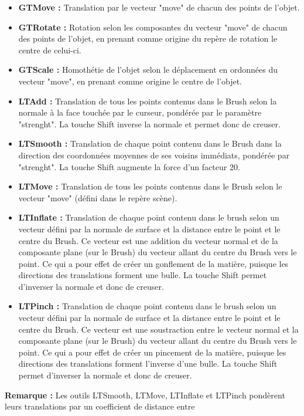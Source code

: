 \documentclass[a4paper]{memoir}
\begin{document}
					\begin{itemize}
						\item \textbf{GTMove :} Translation par le vecteur "move" de chacun des points de l'objet.
						\item \textbf{GTRotate :} Rotation selon les composantes du vecteur "move" de chacun des points de l'objet, en prenant comme origine 
						du repère de rotation le centre de celui-ci.
						\item \textbf{GTScale :} Homothétie de l'objet selon le déplacement en ordonnées du vecteur "move", en prenant comme origine le 
						centre de l'objet.
						\item \textbf{LTAdd :} Translation de tous les points contenus dans le Brush selon la normale à la face touchée par le curseur, 
						pondérée par le paramètre "strenght". La touche Shift inverse la normale et permet donc de creuser.
						\item \textbf{LTSmooth :} Translation de chaque point contenu dans le Brush dans la direction des coordonnées moyennes de ses 
						voisins immédiats, pondérée par "strenght". La touche Shift augmente la force d'un facteur 20.
						\item \textbf{LTMove :} Translation de tous les points contenus dans le Brush selon le vecteur "move" (défini dans le repère scène).
						\item \textbf{LTInflate :} Translation de chaque point contenu dans le brush selon un vecteur défini par la normale de surface et la 
						distance entre le point et le centre du Brush. Ce vecteur est une addition du vecteur normal et de la composante plane (sur le Brush)
						du vecteur allant du centre du Brush vers le point. Ce qui a pour effet de créer un gonflement de la matière, puisque les directions
						des translations forment une bulle. La touche Shift permet d'inverser la normale et donc de creuser.
						\item \textbf{LTPinch :} Translation de chaque point contenu dans le brush selon un vecteur défini par la normale de surface et la 
						distance entre le point et le centre du Brush. Ce vecteur est une soustraction entre le vecteur normal et la composante plane (sur le
						Brush) du vecteur allant du centre du Brush vers le point. Ce qui a pour effet de créer un pincement de la matière, puisque les 
						directions des translations forment l'inverse d'une bulle. La touche Shift permet d'inverser la normale et donc de creuser.
					\end{itemize}
					\textbf{Remarque :} Les outils LTSmooth, LTMove, LTInflate et LTPinch pondèrent leurs translations par un coefficient de distance entre 
\end{document}
